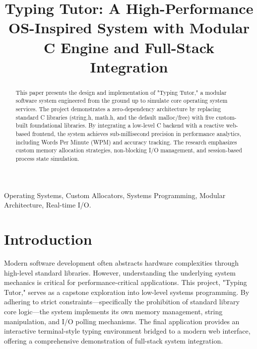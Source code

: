 \documentclass[conference]{IEEEtran}
\begin{document}
\title{Typing Tutor: A High-Performance OS-Inspired System with Modular C Engine and Full-Stack Integration}

\author{
\and
{}
\and
{}
}

\maketitle

\begin{abstract}
This paper presents the design and implementation of "Typing Tutor," a modular software system engineered from the ground up to simulate core operating system services. The project demonstrates a zero-dependency architecture by replacing standard C libraries (string.h, math.h, and the default malloc/free) with five custom-built foundational libraries. By integrating a low-level C backend with a reactive web-based frontend, the system achieves sub-millisecond precision in performance analytics, including Words Per Minute (WPM) and accuracy tracking. The research emphasizes custom memory allocation strategies, non-blocking I/O management, and session-based process state simulation.
\end{abstract}

\begin{IEEEkeywords}
Operating Systems, Custom Allocators, Systems Programming, Modular Architecture, Real-time I/O.
\end{IEEEkeywords}

\section{Introduction}
Modern software development often abstracts hardware complexities through high-level standard libraries. However, understanding the underlying system mechanics is critical for performance-critical applications. This project, "Typing Tutor," serves as a capstone exploration into low-level systems programming. By adhering to strict constraints—specifically the prohibition of standard library core logic—the system implements its own memory management, string manipulation, and I/O polling mechanisms. The final application provides an interactive terminal-style typing environment bridged to a modern web interface, offering a comprehensive demonstration of full-stack system integration.
\end{document}
